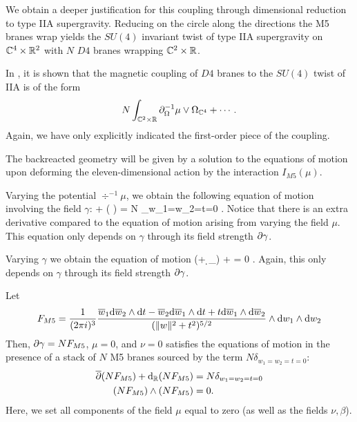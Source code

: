 \parsec[]

We obtain a deeper justification for this coupling through dimensional reduction to type IIA supergravity. 
Reducing on the circle along the directions the M5 branes wrap yields the $SU(4)$ invariant twist of type IIA supergravity on $\mathbb C^4 \times \mathbb R^2$ with $N$ $D4$ branes wrapping $\mathbb C^2 \times \mathbb R$. 

In \cite{CLsugra}, it is shown that the magnetic coupling of $D4$ branes to the $SU(4)$ twist of IIA is of the form
\[
N \int _{\mathbb{C}^2 \times \mathbb R} \partial_{\Omega}^{-1} \mu \vee \Omega_{\mathbb{C}^4} + \cdots .
\]
Again, we have only explicitly indicated the first-order piece of the coupling. 

\parsec[s:m5backreact]

The backreacted geometry will be given by a solution to the equations of motion upon deforming the eleven-dimensional action by the interaction $I_{M5}(\mu)$. 

Varying the potential $\div^{-1} \mu$, we obtain the following equation of motion involving the field $\gamma$:
\beqn\label{eqn:m5eom1}
\dbar \del \gamma + \div \left( \mu\right) \wedge \del \gamma = N \delta_{w_1=w_2=t=0} .
\eeqn
Notice that there is an extra derivative compared to the equation of motion arising from varying the field $\mu$. 
This equation only depends on $\gamma$ through its field strength $\partial \gamma$. 

Varying $\gamma$ we obtain the equation of motion 
\beqn\label{eqn:m5eom2}
(\dbar + \d_\RR) \mu + \del \gamma \del \gamma = 0 .
\eeqn 
Again, this only depends on $\gamma$ through its field strength $\partial \gamma$.


\begin{lem}
\label{lem:ads7flux}
Let
\[
F_{M5} = \frac{1}{(2\pi i)^3} \frac{\overline{w}_1 {\rm d} \overline{w}_2 \wedge {\rm d} t - \overline{w}_2 {\rm d} \overline{w}_1 \wedge {\rm d} t + t {\rm d} \overline{w}_1 \wedge {\rm d} \overline{w}_2}{(\|w\|^2 + t^2)^{5/2}} \wedge {\rm d} w_1 \wedge {\rm d} w_2
\]
Then, $\partial\gamma = N F_{M5}$, $\mu = 0$, and $\nu = 0$ satisfies the equations of motion in the presence of a stack of $N$ M5 branes sourced by the term $N \delta_{w_1=w_2=t=0}$:
\begin{align*}
\overline{\partial} (NF_{M5}) + {\rm d}_{\mathbb R} (NF_{M5}) & = N \delta_{w_1=w_2=t=0}  \\ 
(NF_{M5}) \wedge (NF_{M5}) & = 0 .
\end{align*}
Here, we set all components of the field $\mu$ equal to zero (as well as the fields $\nu,\beta$). 
\end{lem}

